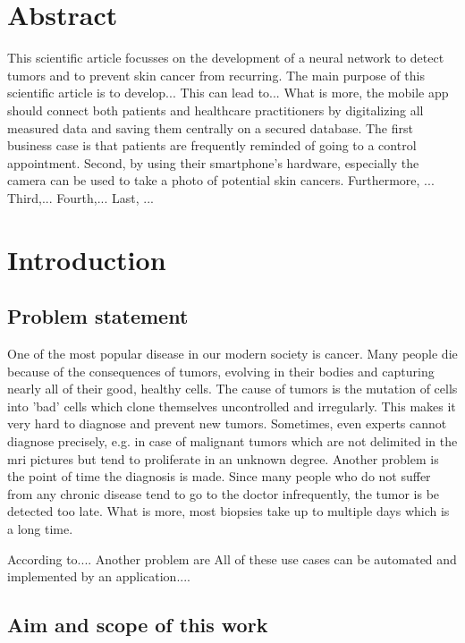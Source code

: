 



\chapter{Abstract}\label{abstract}

This scientific article focusses on the development of a neural network to detect tumors and to prevent skin cancer from recurring.
The main purpose of this scientific article is to develop...
This can lead to...
What is more, the mobile app should connect both patients and healthcare practitioners by digitalizing all measured data and saving them centrally on a secured database. 
The first business case is that patients are frequently reminded of going to a control appointment. 
Second, by using their smartphone's hardware, especially the camera can be used to take a photo of potential skin cancers. 
Furthermore, ...
Third,...
Fourth,...
Last, ...

\chapter{Introduction}\label{introduction}

\section{Problem statement}

One of the most popular disease in our modern society is cancer. Many people die because of the consequences of tumors, evolving in their bodies and capturing nearly all of their good, healthy cells. The cause of tumors is the mutation of cells into 'bad' cells which clone themselves uncontrolled and irregularly. This makes it very hard to diagnose and prevent new tumors. Sometimes, even experts cannot diagnose precisely, e.g. in case of malignant tumors which are not delimited in the \ac{mri} pictures but tend to proliferate in an unknown degree. Another problem is the point of time the diagnosis is made. Since many people who do not suffer from any chronic disease tend to go to the doctor infrequently, the tumor is be detected too late. What is more, most biopsies take up to multiple days which is a long time.

According to....
Another problem are 
All of these use cases can be automated and implemented by an application....

\section{Aim and scope of this work}


